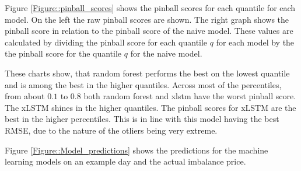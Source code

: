 \documentclass[class=scrbook, crop=false]{standalone}
\begin{document}
Figure \ref{Figure::pinball_scores} shows the pinball scores for each quantile for each model.
On the left the raw pinball scores are shown.
The right graph shows the pinball score in relation to the pinball score of the naive model.
These values are calculated by dividing the pinball score for each quantile $q$ for each model by the the pinball score for the quantile $q$ for the naive model.

These charts show, that random forest performs the best on the lowest quantile and is among the best in the higher quantiles. 
Across most of the percentiles, from about $0.1$ to $0.8$ both random forest and xlstm have the worst pinball score.
The xLSTM shines in the higher quantiles. 
The pinball scores for xLSTM are the best in the higher percentiles. 
This is in line with this model having the best RMSE, due to the nature of the otliers being very extreme.


Figure \ref{Figure::Model_predictions} shows the predictions for the machine learning models on an example day and the actual imbalance price.
\end{document}
